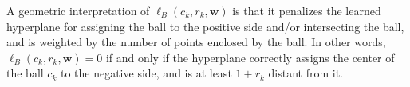 \documentclass[12pt]{article}
\newcommand{\bw}{\mathbf{w}}
\begin{document}
A geometric interpretation of $\ell_B(c_k, r_k, \bw)$ is that it penalizes the learned hyperplane for assigning the ball to the positive side and/or intersecting the ball, and is weighted by the number of points enclosed by the ball. In other words, $\ell_B(c_k, r_k, \bw) = 0$ if and only if the hyperplane correctly assigns the center of the ball $c_k$ to the negative side, and is at least $1+r_k$ distant from it.



\end{document}
